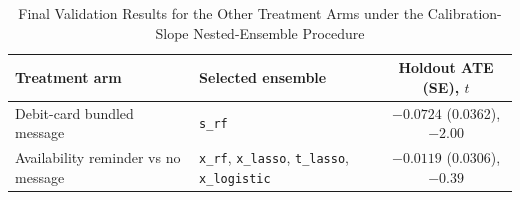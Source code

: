 \begin{table}[ht]
\centering
\caption{Final Validation Results for the Other Treatment Arms under the Calibration-Slope Nested-Ensemble Procedure}
\label{tab:final_results_debit}
\small
\begin{tabular*}{\columnwidth}{@{\extracolsep\fill}p{}p{}c@{\extracolsep\fill}}
\toprule
\textbf{Treatment arm} & \textbf{Selected ensemble} & \textbf{Holdout ATE (SE), $t$} \\
\midrule
Debit-card bundled message & \texttt{s\_rf} & $-0.0724$ (0.0362), $-2.00$ \\
\addlinespace[0.5em]
Availability reminder vs no message & {\raggedright\texttt{x\_rf}, \texttt{x\_lasso}, \texttt{t\_lasso}, \texttt{x\_logistic}\par} & $-0.0119$ (0.0306), $-0.39$ \\
\bottomrule
\end{tabular*}
\end{table}
